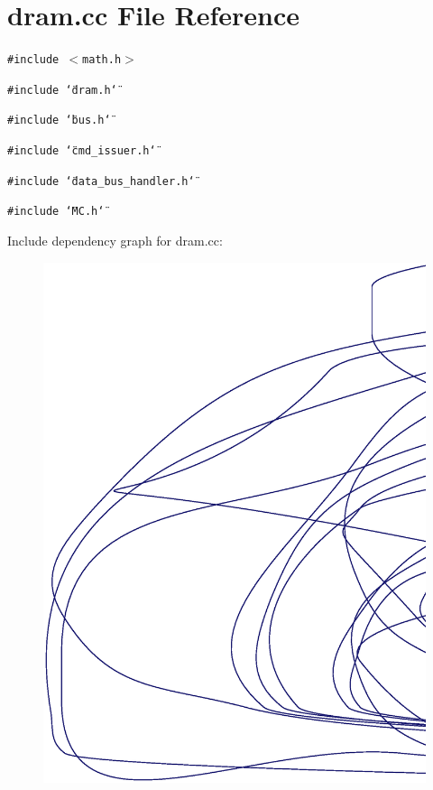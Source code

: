 \section{dram.cc File Reference}
\label{dram_8cc}
{\tt \#include $<$math.h$>$}\par
{\tt \#include \char`\"{}dram.h\char`\"{}}\par
{\tt \#include \char`\"{}bus.h\char`\"{}}\par
{\tt \#include \char`\"{}cmd\_\-issuer.h\char`\"{}}\par
{\tt \#include \char`\"{}data\_\-bus\_\-handler.h\char`\"{}}\par
{\tt \#include \char`\"{}MC.h\char`\"{}}\par


Include dependency graph for dram.cc:\nopagebreak
\begin{figure}[H]
\begin{center}
\leavevmode
\includegraphics[width=420pt]{dram_8cc__incl}
\end{center}
\end{figure}

